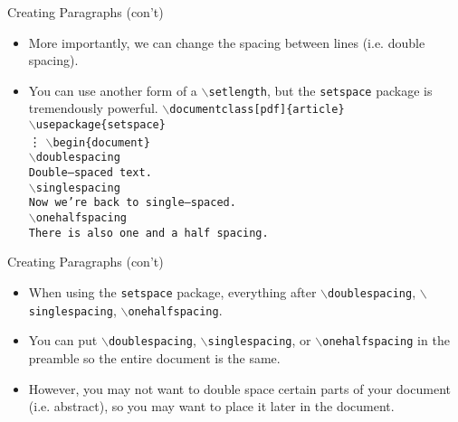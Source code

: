 \documentclass[pdf]{prosper}
\begin{document}
\begin{slide}{Creating Paragraphs (con't)}
	\begin{itemize}
		\item More importantly, we can change the spacing between lines (i.e. double spacing).
		\item You can use another form of a \texttt{$\backslash$setlength}, but the \texttt{setspace} package is tremendously powerful.
			\texttt{$\backslash$documentclass[pdf]\{article\}} \\
			\texttt{$\backslash$usepackage\{setspace\}} \\
			\vdots
			\texttt{$\backslash$begin\{document\}} \\
			\texttt{$\backslash$doublespacing} \\
			\texttt{Double---spaced text.} \\
			\texttt{$\backslash$singlespacing} \\
			\texttt{Now we're back to single---spaced.} \\
			\texttt{$\backslash$onehalfspacing} \\
			\texttt{There is also one and a half spacing.} \\
	\end{itemize}
\end{slide}
\begin{slide}{Creating Paragraphs (con't)}
	\begin{itemize}
		\item When using the \texttt{setspace} package, everything after \texttt{$\backslash$doublespacing}, \texttt{$\backslash$singlespacing}, \texttt{$\backslash$onehalfspacing}.
		\item You can put \texttt{$\backslash$doublespacing}, \texttt{$\backslash$singlespacing}, or \texttt{$\backslash$onehalfspacing} in the preamble so the entire document is the same.
		\item However, you may not want to double space certain parts of your document (i.e. abstract), so you may want to place it later in the document.
	\end{itemize}
\end{slide}
\end{document}
